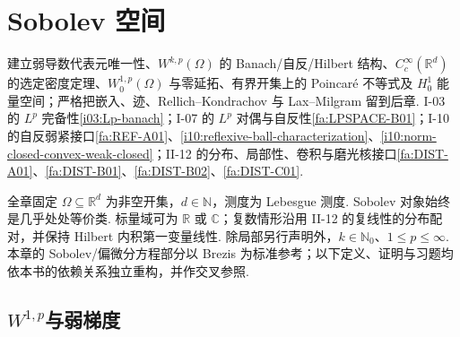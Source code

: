 \chapter{Sobolev 空间}\label{chap:II-13}
\FAChapterOpening
{建立弱导数代表元唯一性、\(\displaystyle W^{k,p}(\Omega)\) 的 Banach/自反/Hilbert 结构、\(\displaystyle C_c^\infty(\mathbb R^d)\) 的选定密度定理、\(\displaystyle W_0^{1,p}(\Omega)\) 与零延拓、有界开集上的 Poincaré 不等式及 \(\displaystyle H_0^1\) 能量空间；严格把嵌入、迹、Rellich--Kondrachov 与 Lax--Milgram 留到后章.}
{I-03 的 \(\displaystyle L^p\) 完备性\autoref{i03:Lp-banach}；I-07 的 \(\displaystyle L^p\) 对偶与自反性\autoref{fa:LPSPACE-B01}；I-10 的自反弱紧接口\autoref{fa:REF-A01}、\autoref{i10:reflexive-ball-characterization}、\autoref{i10:norm-closed-convex-weak-closed}；II-12 的分布、局部性、卷积与磨光核接口\autoref{fa:DIST-A01}、\autoref{fa:DIST-B01}、\autoref{fa:DIST-B02}、\autoref{fa:DIST-C01}.}
{\begin{center}
\end{center}}

全章固定 \(\displaystyle \Omega\subseteq\mathbb R^d\) 为非空开集，\(\displaystyle d\in\mathbb N\)，测度为 Lebesgue 测度. Sobolev 对象始终是几乎处处等价类. 标量域可为 \(\displaystyle\mathbb R\) 或 \(\displaystyle\mathbb C\)；复数情形沿用 II-12 的复线性的分布配对，并保持 Hilbert 内积第一变量线性. 除局部另行声明外，\(\displaystyle k\in\mathbb N_0\)、\(\displaystyle 1\leqslant p\leqslant\infty\). 本章的 Sobolev/偏微分方程部分以 Brezis 为标准参考；以下定义、证明与习题均依本书的依赖关系独立重构，并作交叉参照\cite{brezis2011}.

\section{\texorpdfstring{\(\displaystyle W^{1,p}\)}{W^(1,p)}与弱梯度}\label{sec:ii13-w1p}


